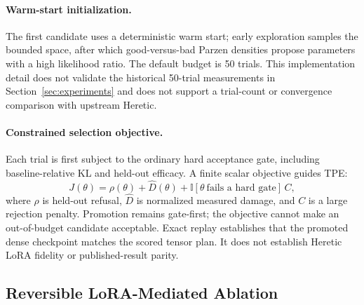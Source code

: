 \documentclass[11pt]{article}
\begin{document}
\paragraph{Warm-start initialization.}
The first candidate uses a deterministic warm start; early exploration samples the bounded space, after which good-versus-bad Parzen densities propose parameters with a high likelihood ratio. The default budget is 50 trials. This implementation detail does not validate the historical 50-trial measurements in Section~\ref{sec:experiments} and does not support a trial-count or convergence comparison with upstream Heretic.

\paragraph{Constrained selection objective.}
Each trial is first subject to the ordinary hard acceptance gate, including baseline-relative KL and held-out efficacy. A finite scalar objective guides TPE:
\begin{equation}
    J(\theta)=\rho(\theta)+\widehat{D}(\theta)+\mathbb{I}[\theta\ \text{fails a hard gate}]\,C,
\end{equation}
where $\rho$ is held-out refusal, $\widehat{D}$ is normalized measured damage, and $C$ is a large rejection penalty. Promotion remains gate-first; the objective cannot make an out-of-budget candidate acceptable. Exact replay establishes that the promoted dense checkpoint matches the scored tensor plan. It does not establish Heretic LoRA fidelity or published-result parity.

\subsection{Reversible LoRA-Mediated Ablation}
\label{sec:lora}
\end{document}
